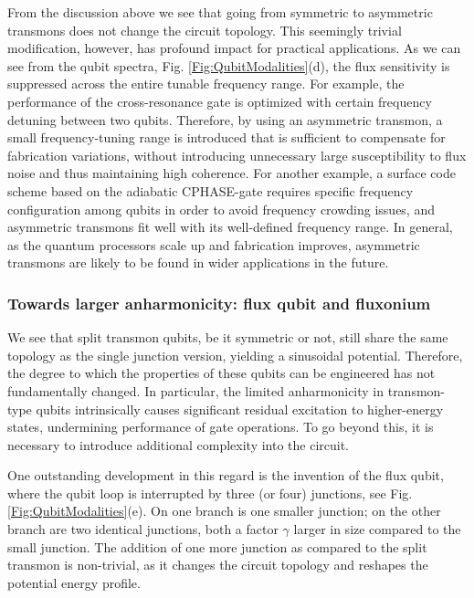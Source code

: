 \documentclass[aip,apr,twocolumn,showpacs,superscriptaddress,groupedaddress,nofootinbib,reprint]{revtex4-1}  %
\begin{document}
From the discussion above we see that going from symmetric to asymmetric transmons does not change the circuit topology. This seemingly trivial modification, however, has profound impact for practical applications. As we can see from the qubit spectra, Fig. \ref{Fig:QubitModalities}(d), the flux sensitivity is suppressed across the entire tunable frequency range. For example, the performance of the cross-resonance gate is optimized with certain frequency detuning between two qubits\cite{Chow2013}. Therefore, by using an asymmetric transmon, a small frequency-tuning range is introduced that is sufficient to compensate for fabrication variations, without introducing unnecessary large susceptibility to flux noise and thus maintaining high coherence. For another example, a surface code scheme based on the adiabatic \textsf{CPHASE}-gate requires specific frequency configuration among qubits in order to avoid frequency crowding issues, and asymmetric transmons fit well with its well-defined frequency range\cite{Versluis2017}. In general, as the quantum processors scale up and fabrication improves, asymmetric transmons are likely to be found in wider applications in the future.

\subsubsection{Towards larger anharmonicity: flux qubit and fluxonium}
We see that split transmon qubits, be it symmetric or not, still share the same topology as the single junction version, yielding a sinusoidal potential. Therefore, the degree to which the properties of these qubits can be engineered has not fundamentally changed. In particular, the limited anharmonicity in transmon-type qubits intrinsically causes significant residual excitation to higher-energy states, undermining performance of gate operations. To go beyond this, it is necessary to introduce additional complexity into the circuit.

One outstanding development in this regard is the invention of the flux qubit\cite{Orlando1999,Mooij1999}, where the qubit loop is interrupted by three (or four) junctions, see Fig. \ref{Fig:QubitModalities}(e). On one branch is one smaller junction; on the other branch are two identical junctions, both a factor $\gamma$ larger in size compared to the small junction. The addition of one more junction as compared to the split transmon is non-trivial, as it changes the circuit topology and reshapes the potential energy profile.
\end{document}

